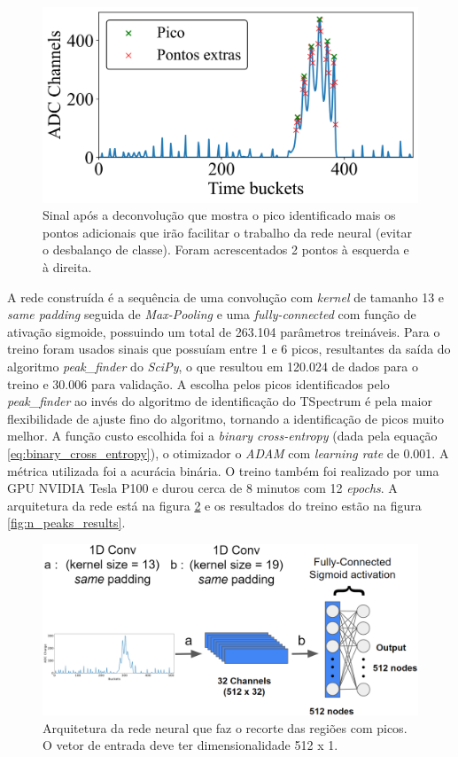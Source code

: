 \documentclass[a4paper,12pt,oneside]{book}
\begin{document}
\begin{figure}[H]
    \centering
    \includegraphics[scale = 0.6]{figs/np_ex1.png}
    \caption{Sinal após a deconvolução que mostra o pico identificado mais os pontos adicionais que irão facilitar o trabalho da rede neural (evitar o desbalanço de classe). Foram acrescentados 2 pontos à esquerda e à direita.}
    \label{fig:n_peaks_exs}
\end{figure}

\par A rede construída é a sequência de uma convolução com \textit{kernel} de tamanho 13 e \textit{same padding} seguida de \textit{Max-Pooling} e uma \textit{fully-connected} com função de ativação sigmoide, possuindo um total de 263.104 parâmetros treináveis. Para o treino foram usados sinais que possuíam entre 1 e 6 picos, resultantes da saída do algoritmo \textit{peak\_finder} do \textit{SciPy}, o que resultou em 120.024 de dados para o treino e 30.006 para validação. A escolha pelos picos identificados pelo \textit{peak\_finder} ao invés do algoritmo de identificação do TSpectrum é pela maior flexibilidade de ajuste fino do algoritmo, tornando a identificação de picos muito melhor\cite{FORTINO2022166497}. A função custo escolhida foi a \textit{binary cross-entropy} (dada pela equação \ref{eq:binary_cross_entropy}), o otimizador o \textit{ADAM} com \textit{learning rate} de 0.001. A métrica utilizada foi a acurácia binária. O treino também foi realizado por uma GPU NVIDIA Tesla P100 e durou cerca de 8 minutos com 12 \textit{epochs}. A arquitetura da rede está na figura \ref{fig:arq:n_peaks} e os resultados do treino estão na figura \ref{fig:n_peaks_results}.

\begin{figure}[H]
    \centering
    \includegraphics[scale = 0.35]{figs/n_peaks.png}
    \caption{Arquitetura da rede neural que faz o recorte das regiões com picos. O vetor de entrada deve ter dimensionalidade 512 x 1.}
    \label{fig:arq:n_peaks}
\end{figure}
\end{document}
